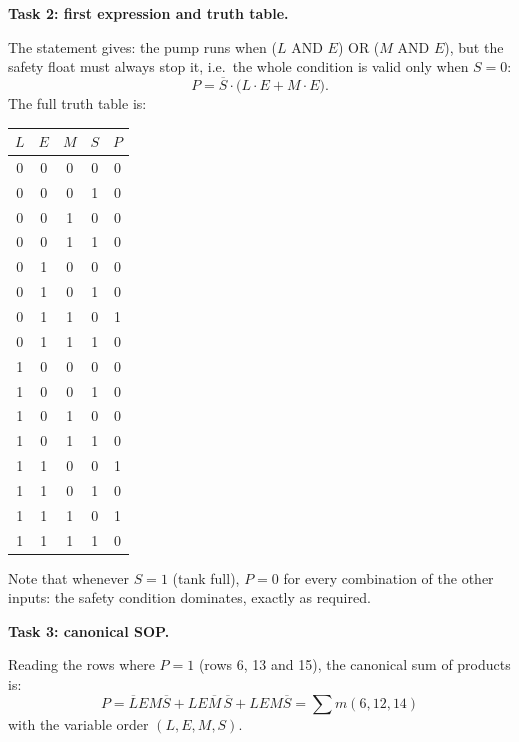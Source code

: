 \documentclass[11pt]{article}
\begin{document}
\textbf{Task 2: first expression and truth table.}\par
The statement gives: the pump runs when ($L$ AND $E$) OR ($M$ AND $E$), but the safety float must always stop it, i.e.\ the whole condition is valid only when $S=0$:
\[ P = \overline{S}\cdot\big(L\cdot E + M\cdot E\big). \]
The full truth table is:
\begin{center}
\begin{tabular}{|cccc|c|}
\hline
\rowcolor{popblueL} $L$ & $E$ & $M$ & $S$ & $P$ \\
\hline
0 & 0 & 0 & 0 & 0 \\
0 & 0 & 0 & 1 & 0 \\
0 & 0 & 1 & 0 & 0 \\
0 & 0 & 1 & 1 & 0 \\
0 & 1 & 0 & 0 & 0 \\
0 & 1 & 0 & 1 & 0 \\
0 & 1 & 1 & 0 & 1 \\
0 & 1 & 1 & 1 & 0 \\
1 & 0 & 0 & 0 & 0 \\
1 & 0 & 0 & 1 & 0 \\
1 & 0 & 1 & 0 & 0 \\
1 & 0 & 1 & 1 & 0 \\
1 & 1 & 0 & 0 & 1 \\
1 & 1 & 0 & 1 & 0 \\
1 & 1 & 1 & 0 & 1 \\
1 & 1 & 1 & 1 & 0 \\
\hline
\end{tabular}
\end{center}
Note that whenever $S=1$ (tank full), $P=0$ for every combination of the other inputs: the safety condition dominates, exactly as required.

\textbf{Task 3: canonical SOP.}\par
Reading the rows where $P=1$ (rows 6, 13 and 15), the canonical sum of products is:
\[ P = \overline{L}EM\overline{S} + LE\overline{M}\,\overline{S} + LEM\overline{S} = \sum m(6,12,14) \]
with the variable order $(L,E,M,S)$.
\end{document}
